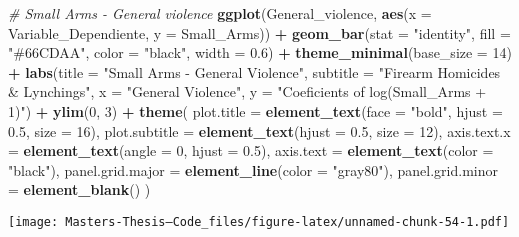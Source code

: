 \documentclass[
  11pt,
]{article}
\newenvironment{Shaded}{\begin{snugshade}}{\end{snugshade}}
\newcommand{\AttributeTok}[1]{\textcolor[rgb]{0.13,0.29,0.53}{#1}}
\newcommand{\CommentTok}[1]{\textcolor[rgb]{0.56,0.35,0.01}{\textit{#1}}}
\newcommand{\DecValTok}[1]{\textcolor[rgb]{0.00,0.00,0.81}{#1}}
\newcommand{\FloatTok}[1]{\textcolor[rgb]{0.00,0.00,0.81}{#1}}
\newcommand{\FunctionTok}[1]{\textcolor[rgb]{0.13,0.29,0.53}{\textbf{#1}}}
\newcommand{\NormalTok}[1]{#1}
\newcommand{\SpecialCharTok}[1]{\textcolor[rgb]{0.81,0.36,0.00}{\textbf{#1}}}
\newcommand{\StringTok}[1]{\textcolor[rgb]{0.31,0.60,0.02}{#1}}
\begin{document}
\begin{Shaded}
\begin{Highlighting}[]
\CommentTok{\# Small Arms {-} General violence}
\FunctionTok{ggplot}\NormalTok{(General\_violence, }\FunctionTok{aes}\NormalTok{(}\AttributeTok{x =}\NormalTok{ Variable\_Dependiente, }\AttributeTok{y =}\NormalTok{ Small\_Arms)) }\SpecialCharTok{+}
  \FunctionTok{geom\_bar}\NormalTok{(}\AttributeTok{stat =} \StringTok{"identity"}\NormalTok{, }\AttributeTok{fill =} \StringTok{"\#66CDAA"}\NormalTok{, }\AttributeTok{color =} \StringTok{"black"}\NormalTok{, }\AttributeTok{width =} \FloatTok{0.6}\NormalTok{) }\SpecialCharTok{+}
  \FunctionTok{theme\_minimal}\NormalTok{(}\AttributeTok{base\_size =} \DecValTok{14}\NormalTok{) }\SpecialCharTok{+}
  \FunctionTok{labs}\NormalTok{(}\AttributeTok{title =} \StringTok{"Small Arms {-} General Violence"}\NormalTok{,}
       \AttributeTok{subtitle =} \StringTok{"Firearm Homicides \& Lynchings"}\NormalTok{,}
       \AttributeTok{x =} \StringTok{"General Violence"}\NormalTok{,}
       \AttributeTok{y =} \StringTok{"Coeficients of log(Small\_Arms + 1)"}\NormalTok{) }\SpecialCharTok{+}
  \FunctionTok{ylim}\NormalTok{(}\DecValTok{0}\NormalTok{, }\DecValTok{3}\NormalTok{) }\SpecialCharTok{+}
  \FunctionTok{theme}\NormalTok{(}
    \AttributeTok{plot.title =} \FunctionTok{element\_text}\NormalTok{(}\AttributeTok{face =} \StringTok{"bold"}\NormalTok{, }\AttributeTok{hjust =} \FloatTok{0.5}\NormalTok{, }\AttributeTok{size =} \DecValTok{16}\NormalTok{),}
    \AttributeTok{plot.subtitle =} \FunctionTok{element\_text}\NormalTok{(}\AttributeTok{hjust =} \FloatTok{0.5}\NormalTok{, }\AttributeTok{size =} \DecValTok{12}\NormalTok{),}
    \AttributeTok{axis.text.x =} \FunctionTok{element\_text}\NormalTok{(}\AttributeTok{angle =} \DecValTok{0}\NormalTok{, }\AttributeTok{hjust =} \FloatTok{0.5}\NormalTok{),}
    \AttributeTok{axis.text =} \FunctionTok{element\_text}\NormalTok{(}\AttributeTok{color =} \StringTok{"black"}\NormalTok{),}
    \AttributeTok{panel.grid.major =} \FunctionTok{element\_line}\NormalTok{(}\AttributeTok{color =} \StringTok{"gray80"}\NormalTok{),}
    \AttributeTok{panel.grid.minor =} \FunctionTok{element\_blank}\NormalTok{()}
\NormalTok{  )}
\end{Highlighting}
\end{Shaded}

\texttt{[image: Masters-Thesis--Code\_files/figure-latex/unnamed-chunk-54-1.pdf]}
\end{document}
